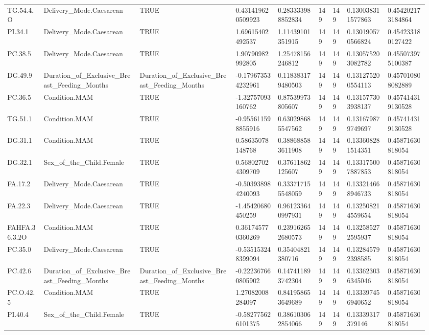 \begin{longtable}{lllllllll}
TG.54.4.O & Delivery\_Mode.Caesarean & TRUE & 0.431419620509923 & 0.283333988852834 & 149 & 149 & 0.130038311577863 & 0.454202173184864 \\
PI.34.1 & Delivery\_Mode.Caesarean & TRUE & 1.69615402492537 & 1.11439101351915 & 149 & 149 & 0.130190570566824 & 0.454233180127422 \\
PC.38.5 & Delivery\_Mode.Caesarean & TRUE & 1.90790982992805 & 1.25478156246812 & 149 & 149 & 0.130575203082782 & 0.455073975100387 \\
DG.49.9 & Duration\_of\_Exclusive\_Breast\_Feeding\_Months & Duration\_of\_Exclusive\_Breast\_Feeding\_Months & -0.179673534232961 & 0.118383179480503 & 149 & 149 & 0.131275200554113 & 0.457010808082889 \\
PC.36.5 & Condition.MAM & TRUE & -1.32757093160762 & 0.87539973805607 & 149 & 149 & 0.131577303938137 & 0.457414319130528 \\
TG.51.1 & Condition.MAM & TRUE & -0.955611598855916 & 0.630298685547562 & 149 & 149 & 0.131679879749697 & 0.457414319130528 \\
DG.31.1 & Condition.MAM & TRUE & 0.58635078148768 & 0.388688583611908 & 149 & 149 & 0.133608281514351 & 0.45871630818054 \\
DG.32.1 & Sex\_of\_the\_Child.Female & TRUE & 0.568027024309709 & 0.37611862125607 & 149 & 149 & 0.133175007887853 & 0.45871630818054 \\
FA.17.2 & Delivery\_Mode.Caesarean & TRUE & -0.503938984240093 & 0.333717155548059 & 149 & 149 & 0.133214668946733 & 0.45871630818054 \\
FA.22.3 & Delivery\_Mode.Caesarean & TRUE & -1.45420680450259 & 0.961233640997931 & 149 & 149 & 0.132508214559654 & 0.45871630818054 \\
FAHFA.36.3.2O & Condition.MAM & TRUE & 0.361745770360269 & 0.239162652680573 & 149 & 149 & 0.132585272595937 & 0.45871630818054 \\
PC.35.0 & Delivery\_Mode.Caesarean & TRUE & -0.535153248399094 & 0.35404821380716 & 149 & 149 & 0.132845792398585 & 0.45871630818054 \\
PC.42.6 & Duration\_of\_Exclusive\_Breast\_Feeding\_Months & Duration\_of\_Exclusive\_Breast\_Feeding\_Months & -0.222367660805902 & 0.147411893742304 & 149 & 149 & 0.133623036345046 & 0.45871630818054 \\
PC.O.42.5 & Condition.MAM & TRUE & 1.27082008284097 & 0.841958653649689 & 149 & 149 & 0.133397456940652 & 0.45871630818054 \\
PI.40.4 & Sex\_of\_the\_Child.Female & TRUE & -0.582775626101375 & 0.386103062854066 & 149 & 149 & 0.13339317379146 & 0.45871630818054 \\

\end{longtable}
